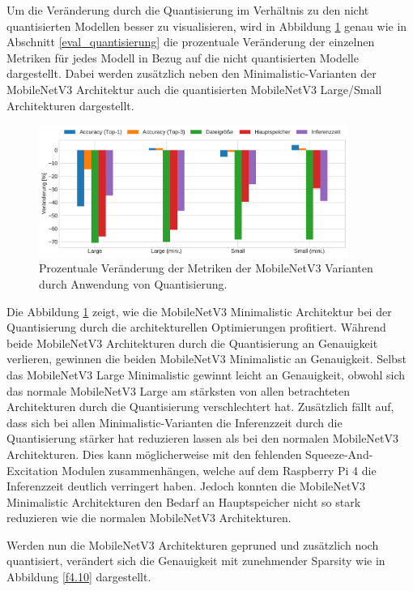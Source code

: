 Um die Veränderung durch die Quantisierung im Verhältnis zu den nicht quantisierten Modellen besser zu visualisieren, wird in Abbildung \ref{f4.9} genau wie in Abschnitt \ref{eval_quantisierung} die prozentuale Veränderung der einzelnen Metriken für jedes Modell in Bezug auf die nicht quantisierten Modelle dargestellt. Dabei werden zusätzlich neben den Minimalistic-Varianten der MobileNetV3 Architektur auch die quantisierten MobileNetV3 Large/Small Architekturen dargestellt.

\begin{figure}[htbp]
\centerline{\includegraphics[width=0.9\textwidth]{content/images/quantization_improvements_mnv3mini.pdf}}
\caption{Prozentuale Veränderung der Metriken der MobileNetV3 Varianten durch Anwendung von Quantisierung.}
\label{f4.9}
\end{figure}

Die Abbildung \ref{f4.9} zeigt, wie die MobileNetV3 Minimalistic Architektur bei der Quantisierung durch die architekturellen Optimierungen profitiert. Während beide MobileNetV3 Architekturen durch die Quantisierung an Genauigkeit verlieren, gewinnen die beiden MobileNetV3 Minimalistic an Genauigkeit. Selbst das MobileNetV3 Large Minimalistic gewinnt leicht an Genauigkeit, obwohl sich das normale MobileNetV3 Large am stärksten von allen betrachteten Architekturen durch die Quantisierung verschlechtert hat. Zusätzlich fällt auf, dass sich bei allen Minimalistic-Varianten die Inferenzzeit durch die Quantisierung stärker hat reduzieren lassen als bei den normalen MobileNetV3 Architekturen. Dies kann möglicherweise mit den fehlenden Squeeze-And-Excitation Modulen zusammenhängen, welche auf dem Raspberry Pi 4 die Inferenzzeit deutlich verringert haben. Jedoch konnten die MobileNetV3 Minimalistic Architekturen den Bedarf an Hauptspeicher nicht so stark reduzieren wie die normalen MobileNetV3 Architekturen.

Werden nun die MobileNetV3 Architekturen gepruned und zusätzlich noch quantisiert, verändert sich die Genauigkeit mit zunehmender Sparsity wie in Abbildung \ref{f4.10} dargestellt.

